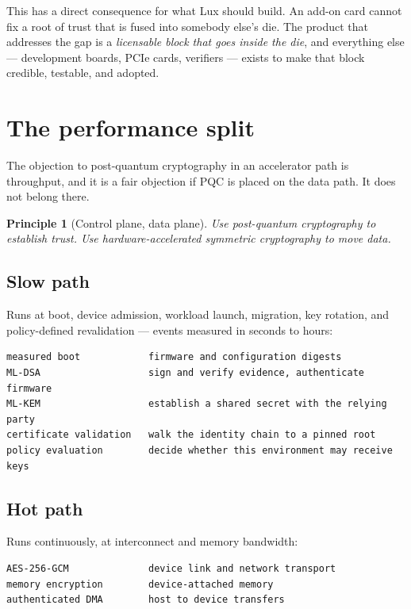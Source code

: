 \documentclass[11pt,a4paper]{article}
\newtheorem{principle}{Principle}
\begin{document}
This has a direct consequence for what Lux should build. An add-on card cannot
fix a root of trust that is fused into somebody else's die. The product that
addresses the gap is a \emph{licensable block that goes inside the die}, and
everything else --- development boards, PCIe cards, verifiers --- exists to make
that block credible, testable, and adopted.

\section{The performance split}

The objection to post-quantum cryptography in an accelerator path is
throughput, and it is a fair objection if PQC is placed on the data path. It
does not belong there.

\begin{principle}[Control plane, data plane]
Use post-quantum cryptography to establish trust. Use hardware-accelerated
symmetric cryptography to move data.
\end{principle}

\subsection{Slow path}

Runs at boot, device admission, workload launch, migration, key rotation, and
policy-defined revalidation --- events measured in seconds to hours:

\begin{lstlisting}
measured boot            firmware and configuration digests
ML-DSA                   sign and verify evidence, authenticate firmware
ML-KEM                   establish a shared secret with the relying party
certificate validation   walk the identity chain to a pinned root
policy evaluation        decide whether this environment may receive keys
\end{lstlisting}

\subsection{Hot path}

Runs continuously, at interconnect and memory bandwidth:

\begin{lstlisting}
AES-256-GCM              device link and network transport
memory encryption        device-attached memory
authenticated DMA        host to device transfers
\end{lstlisting}
\end{document}
